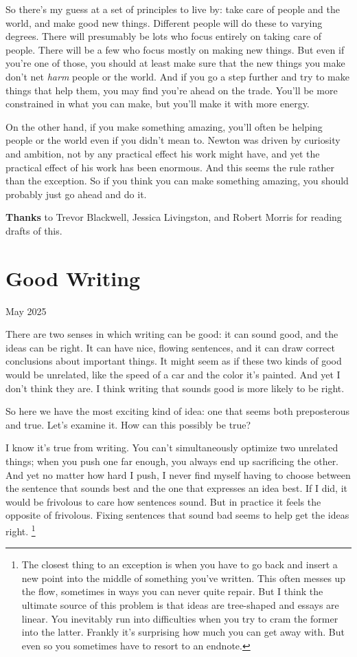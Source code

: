 \documentclass[12pt]{book}
\begin{document}
So there's my guess at a set of principles to live by: take care of
people and the world, and make good new things. Different people will do
these to varying degrees. There will presumably be lots who focus
entirely on taking care of people. There will be a few who focus mostly
on making new things. But even if you're one of those, you should at
least make sure that the new things you make don't net \emph{harm}
people or the world. And if you go a step further and try to make things
that help them, you may find you're ahead on the trade. You'll be more
constrained in what you can make, but you'll make it with more energy.

On the other hand, if you make something amazing, you'll often be
helping people or the world even if you didn't mean to. Newton was
driven by curiosity and ambition, not by any practical effect his work
might have, and yet the practical effect of his work has been enormous.
And this seems the rule rather than the exception. So if you think you
can make something amazing, you should probably just go ahead and do it.


\textbf{Thanks} to Trevor Blackwell, Jessica Livingston, and Robert
Morris for reading drafts of this.
\chapter{Good Writing}

May 2025

There are two senses in which writing can be good: it can sound good,
and the ideas can be right. It can have nice, flowing sentences, and it
can draw correct conclusions about important things. It might seem as if
these two kinds of good would be unrelated, like the speed of a car and
the color it's painted. And yet I don't think they are. I think writing
that sounds good is more likely to be right.

So here we have the most exciting kind of idea: one that seems both
preposterous and true. Let's examine it. How can this possibly be true?

I know it's true from writing. You can't simultaneously optimize two
unrelated things; when you push one far enough, you always end up
sacrificing the other. And yet no matter how hard I push, I never find
myself having to choose between the sentence that sounds best and the
one that expresses an idea best. If I did, it would be frivolous to care
how sentences sound. But in practice it feels the opposite of frivolous.
Fixing sentences that sound bad seems to help get the ideas right.
\footnote{The closest thing to an exception is when you have to go back
and insert a new point into the middle of something you've written. This
often messes up the flow, sometimes in ways you can never quite repair.
But I think the ultimate source of this problem is that ideas are
tree-shaped and essays are linear. You inevitably run into difficulties
when you try to cram the former into the latter. Frankly it's surprising
how much you can get away with. But even so you sometimes have to resort
to an endnote.}
\end{document}

